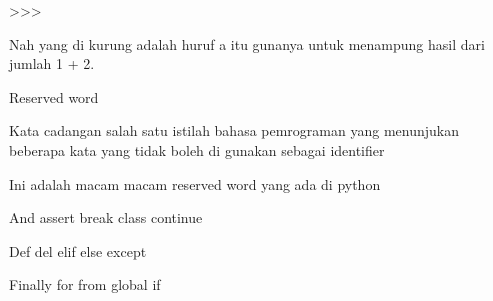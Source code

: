 \vspace{14pt}
\noindent 
{\fontsize{14pt}{14pt}\selectfont >>> \\} \par
\noindent 
{\fontsize{14pt}{14pt}\selectfont Nah yang di kurung adalah huruf a itu gunanya untuk menampung hasil dari jumlah 1 + 2.  \\} \par
\vspace{14pt}
\noindent 
{\fontsize{14pt}{14pt}\selectfont Reserved word  \\} \par
\vspace{14pt}
\noindent 
{\fontsize{14pt}{14pt}\selectfont Kata cadangan salah satu istilah bahasa pemrograman yang menunjukan beberapa kata yang tidak boleh di gunakan sebagai identifier \\} \par
\vspace{14pt}
\noindent 
{\fontsize{14pt}{14pt}\selectfont Ini adalah macam macam reserved word yang ada di python \\} \par
\vspace{14pt}
\noindent 
{\fontsize{14pt}{14pt}\selectfont And  \hspace*{0.5in}   assert \hspace*{0.5in}   break \hspace*{0.5in}   class \hspace*{0.5in}   continue \hspace*{0.5in} \\} \par
\vspace{14pt}
\noindent 
{\fontsize{14pt}{14pt}\selectfont Def \hspace*{0.5in}   del \hspace*{0.5in}   elif \hspace*{0.5in}   else \hspace*{0.5in}   except \hspace*{0.5in} \\} \par
\noindent 
{\fontsize{14pt}{14pt}\selectfont Finally \hspace*{0.5in} for \hspace*{0.5in}   from  \hspace*{0.5in}   global \hspace*{0.5in} if \hspace*{0.5in} \\} \par

